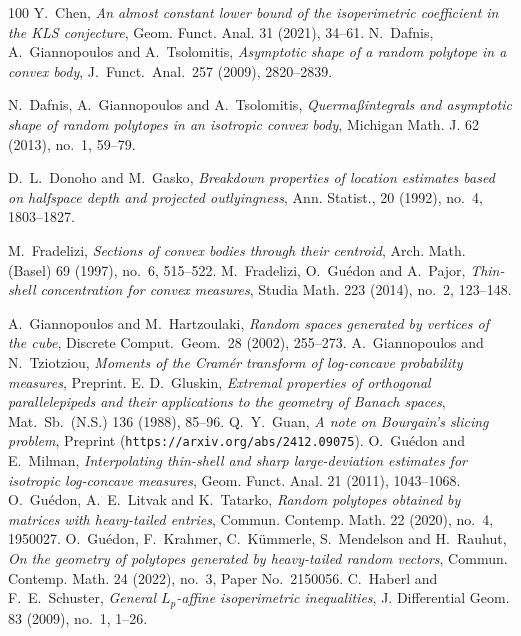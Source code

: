 \documentclass[11pt,leqno]{article}
\theoremstyle{definition}
\theoremstyle{remark}
\numberwithin{equation}{section}
\newcommand{\1}{\textbf{1}}
\begin{document}
\begin{thebibliography}{100}
 {Y.~Chen,} \textit{An almost constant lower bound of the isoperimetric coefficient in the KLS conjecture},
Geom. Funct. Anal. {31} (2021), 34--61.
 \textrm{N.\ Dafnis, A.\ Giannopoulos and A.\ Tsolomitis},
\textit{Asymptotic shape of a random polytope in a convex body},
J.\ Funct.\ Anal.\ {257} (2009), 2820--2839.


 \textrm{N.\ Dafnis, A.~Giannopoulos and A.~Tsolomitis},
\textit{Querma\ss{}integrals and asymptotic shape of random polytopes in an isotropic convex body},
Michigan Math. J. 62 (2013), no.~1, 59--79.

 \textrm{D.\ L.\ Donoho and M.\ Gasko}, \textit{Breakdown properties of location estimates
based on halfspace depth and projected outlyingness}, Ann. Statist., 20 (1992), no.~4, 1803--1827.

 \textrm{M.\ Fradelizi}, \textit{Sections of convex bodies through their centroid},
Arch. Math. (Basel) {69} (1997), no.~6, 515--522.
 \textrm{M.~Fradelizi, O.~Gu\'{e}don and A.~Pajor},
\textit{Thin-shell concentration for convex measures}, Studia Math. 223 (2014), no.~2, 123--148.

 \textrm{A.\ Giannopoulos and M.\ Hartzoulaki},
\textit{Random spaces generated by vertices of the cube}, Discrete Comput.\ Geom.\ {28} (2002), 255--273.
 \textrm{A.\ Giannopoulos and N.\ Tziotziou}, \textit{Moments of the Cram\'{e}r
transform of log-concave probability measures}, Preprint.
 \textrm{E. D.\ Gluskin}, \textit{Extremal properties of orthogonal parallelepipeds and their
applications to the geometry of Banach spaces}, Mat.\ Sb.\ (N.S.) {136} (1988), 85--96.
 Q.~Y.~Guan, \textit{A note on Bourgain's slicing problem}, Preprint ({\tt https://arxiv.org/abs/2412.09075}).
 \textrm{O.\ Gu\'{e}don and E.\ Milman}, \textit{Interpolating thin-shell and
sharp large-deviation estimates for isotropic log-concave measures}, Geom. Funct. Anal. {21} (2011), 1043--1068.
  \textrm{O.\ Gu\'{e}don, A.\ E.\ Litvak and K.\ Tatarko}, \textit{Random polytopes obtained by matrices
with heavy-tailed entries}, Commun. Contemp. Math. 22 (2020), no.~4, 1950027.
 \textrm{O.\ Gu\'{e}don, F.\ Krahmer, C.\ K\"{u}mmerle, S.\ Mendelson and H.\ Rauhut},
\textit{On the geometry of polytopes generated by heavy-tailed random vectors}, Commun. Contemp. Math. 24 (2022), no.~3, Paper No.~2150056.
  \textrm{C.\ Haberl and F.\ E.\ Schuster}, \textit{General $L_p$-affine isoperimetric inequalities},
J. Differential Geom. 83 (2009), no.~1, 1--26.


\end{thebibliography}
\end{document}
